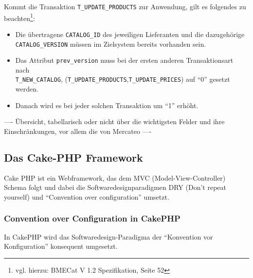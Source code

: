 	Kommt die Transaktion \texttt{T\_UPDATE\_PRODUCTS} zur Anwendung, gilt es folgendes zu beachten\footnote{vgl. hierzu: BMECat V 1.2 Spezifikation, Seite 52}: 
	\begin{itemize}
		\item Die übertragene \texttt{CATALOG\_ID} des jeweiligen Lieferanten und die dazugehörige\\ \texttt{CATALOG\_VERSION} müssen im Zielsystem bereits vorhanden sein.
		\item Das Attribut \texttt{prev\_version} muss bei der ersten anderen Transaktionsart nach\\ \texttt{T\_NEW\_CATALOG}, (\texttt{T\_UPDATE\_PRODUCTS},\texttt{T\_UPDATE\_PRICES}) auf \enquote{0} gesetzt werden.
		\item Danach wird es bei jeder solchen Transaktion um \enquote{1} erhöht.
	\end{itemize}
	
	
	---- Übersicht, tabellarisch oder nicht über die wichtigsten Felder und ihre Einschränkungen, vor allem die von Mercateo ----
	
	\subsection{Das Cake-PHP Framework}
	
	Cake PHP ist ein Webframework, das dem MVC (Model-View-Controller) Schema folgt und dabei die Softwaredesignparadigmen DRY (Don't repeat yourself) und \enquote{Convention over configuration} umsetzt. 
	
	\subsubsection{Convention over Configuration in CakePHP}
	
	In CakePHP wird das Softwaredesign-Paradigma der \enquote{Konvention vor Konfiguration} konsequent umgesetzt.\newline %
	

